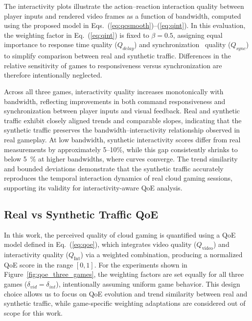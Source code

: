 The interactivity plots illustrate the action–reaction interaction quality between player inputs and rendered video frames as a function of bandwidth, computed using the proposed model in Eqs.~(\ref{eq:qcsmooth})–(\ref{eq:qint}). In this evaluation, the weighting factor in Eq.~(\ref{eq:qint}) is fixed to $\beta=0.5$, assigning equal importance to response time quality ($Q_{delay}$) and synchronization ~quality ($Q_{sync}$) to simplify comparison between real and synthetic traffic. Differences in the relative sensitivity of games to responsiveness versus synchronization are therefore intentionally neglected.

Across all three games, interactivity quality increases monotonically with bandwidth, reflecting improvements in both command responsiveness and synchronization between player inputs and visual feedback. Real and synthetic traffic exhibit closely aligned trends and comparable slopes, indicating that the synthetic traffic preserves the bandwidth–interactivity relationship observed in real gameplay. At low bandwidth, synthetic interactivity scores differ from real measurements by approximately 5–10\%, while this gap consistently shrinks to below 5~\% at higher bandwidths, where curves converge.
The trend similarity and bounded deviations demonstrate that the synthetic traffic accurately reproduces the temporal interaction dynamics of real cloud gaming sessions, supporting its validity for interactivity-aware QoE analysis.


\subsection{Real vs Synthetic Traffic QoE}
In this work, the perceived quality of cloud gaming is quantified using a QoE model defined in Eq.~(\ref{eq:qoe}), which integrates video quality ($Q_{\text{video}}$) and interactivity quality ($Q_{\text{Int}}$) via a weighted combination, producing a normalized QoE score in the range $[0,1]$.
For the experiments shown in Figure~\ref{fig:qoe_three_games}, the weighting factors are set equally for all three games ($\delta_{vid}=\delta_{int}$), intentionally assuming uniform game behavior. This design choice allows us to focus on QoE evolution and trend similarity between real and synthetic traffic, while game-specific weighting adaptations are considered out of scope for this work.


